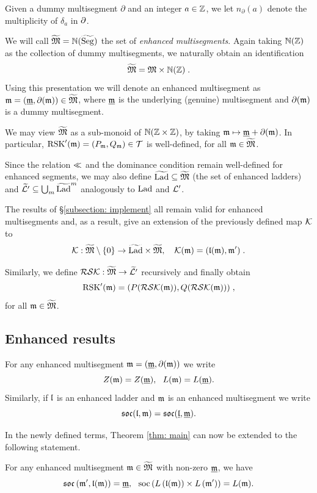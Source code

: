 \documentclass{ert-l} %
\begin{document}
Given a dummy multisegment $\partial$ and an integer $a\in\mathbb{Z}$, we let $n_\partial(a)$ denote the multiplicity of $\delta_a$ in $\partial$.


We will call $\widetilde{\mathfrak{M}} = \mathbb{N}(\widetilde{\operatorname{Seg}})$ the set of \textit{enhanced multisegments}.
Again taking $\mathbb{N}(\mathbb{Z})$ as the collection of dummy multisegments, we naturally obtain an identification
\[
\widetilde{\mathfrak{M}} = \mathfrak{M} \times \mathbb{N}(\mathbb{Z})\;.
\]
Using this presentation we will denote an enhanced multisegment as $\mathfrak{m} = (\underline{\mathfrak{m}}, \partial(\mathfrak{m}))\in \widetilde{\mathfrak{M}}$, where $\underline{\mathfrak{m}}$ is the underlying
(genuine) multisegment and $\partial(\mathfrak{m})$ is a dummy multisegment.


We may view $\widetilde{\mathfrak{M}}$ as a sub-monoid of $\mathbb{N}(\mathbb{Z}\times\mathbb{Z})$, by taking $\mathfrak{m} \mapsto \underline{\mathfrak{m}}+ \partial(\mathfrak{m})$.
In particular, $ \operatorname{RSK}'(\mathfrak{m})= (P_{\mathfrak{m}},Q_{\mathfrak{m}})\in \mathcal{T}$ is well-defined, for all $\mathfrak{m}\in \widetilde{\mathfrak{M}}$.

Since the relation $\ll$ and the dominance condition remain well-defined for enhanced segments, we may also define
$\widetilde{\operatorname{Lad}} \subseteq \widetilde{\mathfrak{M}}$ (the set of enhanced ladders) and
$\widetilde{\mathcal{L}'} \subseteq \bigcup_m \widetilde{\operatorname{Lad}}^m$ analogously to $\operatorname{Lad}$ and $\mathcal{L}'$.

The results of \S\ref{subsection: implement} all remain valid for enhanced multisegments and, as a result, give an extension of the previously defined map $\mathcal{K}$ to
\[
\mathcal{K}: \widetilde{\mathfrak{M}}\setminus\{0\} \to \widetilde{\operatorname{Lad}} \times \widetilde{\mathfrak{M}},\quad \mathcal{K}(\mathfrak{m})=(\mathfrak{l}(\mathfrak{m}),\mathfrak{m}')\;.
\]

Similarly, we define $\mathcal{RSK}: \widetilde{\mathfrak{M}} \to \widetilde{\mathcal{L}'}$ recursively and finally obtain
\[
\operatorname{RSK}'(\mathfrak{m}) = (P(\mathcal{RSK}(\mathfrak{m})),Q(\mathcal{RSK}(\mathfrak{m})))\;,
\]
for all $\mathfrak{m}\in \widetilde{\mathfrak{M}}$.

\subsection{Enhanced results}
For any enhanced multisegment $\mathfrak{m}=(\underline{\mathfrak{m}},\partial(\mathfrak{m}))$ we write
\[
Z(\m)=Z(\underline{\m}),\ \ L(\m)=L(\underline{\m}).
\]
Similarly, if $\mathfrak{l}$ is an enhanced ladder and $\mathfrak{m}$ is an enhanced multisegment we write
\[
\mathfrak{soc}(\mathfrak{l},\mathfrak{m})=\mathfrak{soc}(\underline{\mathfrak{l}},\underline{\mathfrak{m}}).
\]

In the newly defined terms, Theorem \ref{thm: main} can now be extended to the following statement.
\begin{theorem}\label{thm: dummy}
For any enhanced multisegment $\mathfrak{m}\in \widetilde{\mathfrak{M}}$ with non-zero $\underline{\mathfrak{m}}$, we have
\[
\socm\left(\drv\m,\ldrr{\m}\right)=\underline{\m},\ \ \soc\left(L\left(\ldrr{\m}\right)\times L\left(\drv\m\right)\right)=L(\m).
\]
\end{theorem}
\end{document}
